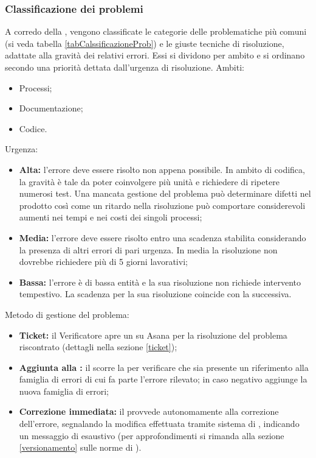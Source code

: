 \documentclass[12pt,a4paper]{article}
\begin{document}
\subsubsection{Classificazione dei problemi}
A corredo della , vengono classificate le categorie delle problematiche più comuni (si veda tabella \ref{tabCalssificazioneProb}) e le giuste tecniche di risoluzione, adattate alla gravità dei relativi errori. Essi si dividono per ambito e si ordinano secondo una priorità dettata dall'urgenza di risoluzione. Ambiti:
\begin{itemize}
  \item Processi;
  \item Documentazione;
  \item Codice.
\end{itemize}
Urgenza:
\begin{itemize}
  \item \textbf{Alta:} l'errore deve essere risolto non appena possibile. In ambito di codifica, la gravità è tale da poter coinvolgere più unità e richiedere di ripetere numerosi test. Una mancata gestione del problema può determinare difetti nel prodotto così come un ritardo nella risoluzione può comportare considerevoli aumenti nei tempi e nei costi dei singoli processi;
  \item \textbf{Media:} l'errore deve essere risolto entro una scadenza stabilita considerando la presenza di altri errori di pari urgenza. In media la risoluzione non dovrebbe richiedere più di 5 giorni lavorativi;
  \item \textbf{Bassa:} l'errore è di bassa entità e la sua risoluzione non richiede intervento tempestivo. La scadenza per la sua risoluzione coincide con la  successiva.
\end{itemize}
Metodo di gestione del problema:
\begin{itemize}
  \item \textbf{Ticket:} il Verificatore apre un  su Asana per la risoluzione del problema riscontrato (dettagli nella sezione \ref{ticket});
  \item \textbf{Aggiunta alla :} il \VR{} scorre la  per verificare che sia presente un riferimento alla famiglia di errori di cui fa parte l'errore rilevato; in caso negativo aggiunge la nuova famiglia di errori;
  \item \textbf{Correzione immediata:} il \VR{} provvede autonomamente alla correzione dell'errore, segnalando la modifica effettuata tramite sistema di , indicando un messaggio di  esaustivo (per approfondimenti si rimanda alla sezione \ref{versionamento} sulle norme di ).
\end{itemize}
\end{document}
